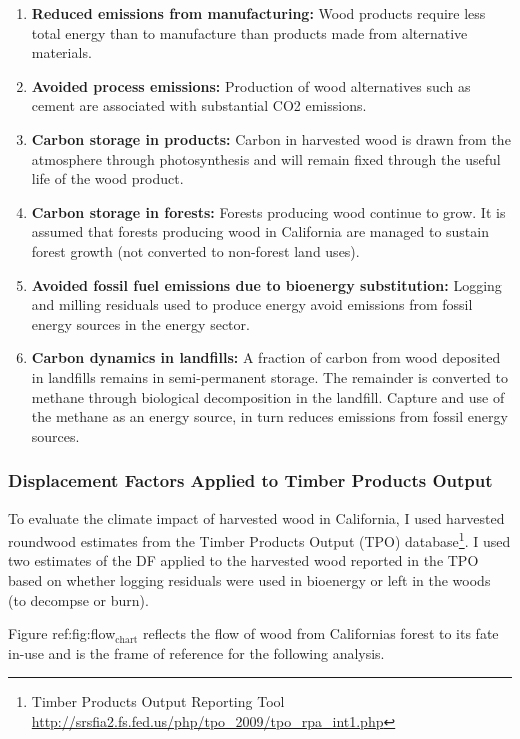 \documentclass[a4paper]{article}
\begin{document}
\begin{enumerate}
\item \textbf{Reduced emissions from manufacturing:} Wood products require less total
energy than to manufacture than products made from alternative materials.
\item \textbf{Avoided process emissions:} Production of wood alternatives such as cement are associated with 
substantial CO2 emissions.
\item \textbf{Carbon storage in products:} Carbon in harvested wood is drawn from
the atmosphere through photosynthesis and will remain fixed through
the useful life of the wood product.
\item \textbf{Carbon storage in forests:} Forests producing wood continue to grow.
It is assumed that forests producing wood in California are managed
to sustain forest growth (not converted to non-forest land uses).
\item \textbf{Avoided fossil fuel emissions due to bioenergy substitution:}
Logging and milling residuals used to produce energy avoid emissions
from fossil energy sources in the energy sector.
\item \textbf{Carbon dynamics in landfills:} A fraction of carbon from wood
deposited in landfills remains in semi-permanent storage.
The remainder is converted to methane through biological
decomposition in the landfill. Capture and use of the methane as an
energy source, in turn reduces emissions from fossil energy sources.
\end{enumerate}

\subsubsection{Displacement Factors Applied to Timber Products Output}
\label{sec-1-3-2}

To evaluate the climate impact of harvested wood in California, I used
harvested roundwood estimates from the Timber Products Output (TPO)
database\footnote{Timber Products Output Reporting Tool \href{http://srsfia2.fs.fed.us/php/tpo_2009/tpo_rpa_int1.php}{\url{http://srsfia2.fs.fed.us/php/tpo_2009/tpo_rpa_int1.php}}}. I used two estimates of the DF applied
to the harvested wood reported in the TPO based on whether logging
residuals were used in bioenergy or left in the woods (to decompse or
burn).

Figure ref:fig:flow$_{\text{chart}}$ reflects the flow of wood
from Californias forest to its fate in-use and is the frame of
reference for the following analysis.
\end{document}
